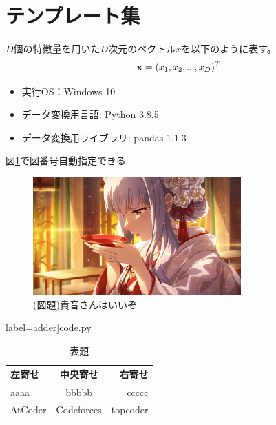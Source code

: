 \documentclass[12pt, dvipdfmx,autodetect-engine]{jsarticle}
\begin{document}
\section{テンプレート集}
$D$個の特徴量を用いた$D$次元のベクトル$x$を以下のように表す。
\begin{equation}
	\mathbf{x} = (x_1, x_2, ..., x_D)^T \notag
\end{equation}
\begin{itemize}
    \item 実行OS：Windows 10
    \item データ変換用言語: Python 3.8.5
    \item データ変換用ライブラリ: pandas 1.1.3
\end{itemize}
図\ref{fig:model}で図番号自動指定できる
\begin{figure}[h]
	\centering
	\includegraphics[width=8cm]{fig/takane.png}
	\caption{(図題)貴音さんはいいぞ}
	\label{fig:model}
\end{figure}
 label=adder]{code.py}
\begin{table}[H]
	\caption{表題}
	\label{table:car_data}
	\centering
	\begin{tabular}{|l|c|r|}
		\hline
		左寄せ&		中央寄せ&		右寄せ\\ \hline\hline
		aaaa  &		bbbbb &     ccccc	\\ \hline
		AtCoder  &		 Codeforces     &	topcoder 		\\ \hline
	\end{tabular}
\end{table}
\newpage
\end{document}
